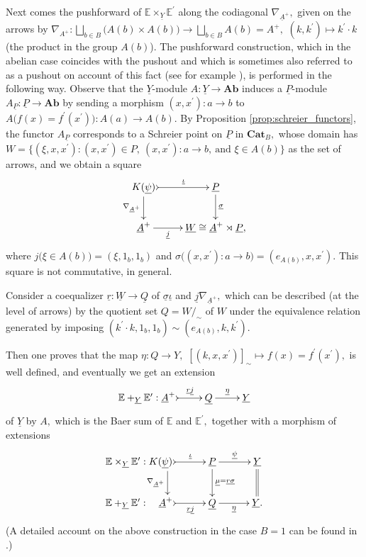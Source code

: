 \documentclass[11pt]{amsart}
\theoremstyle{plain}
\theoremstyle{definition}
\theoremstyle{remark}
\newcommand{\un}{\underline}
\begin{document}
Next comes the pushforward of $\mathbb{E}\times_{\un{Y}}\mathbb{E}^\prime$ along the codiagonal $\nabla_{\un{A}^+},$ given on the arrows by $\nabla_{A^+}\colon\bigsqcup_{b\in B}\big(A(b)\times A(b)\big)\longrightarrow\bigsqcup_{b\in B}A(b)=A^+,$ $(k,k^\prime)\mapsto k^\prime\cdot k$ (the product in the group $A(b)$). The pushforward construction, which in the abelian case coincides with the pushout and which is sometimes also referred to as a pushout on account of this fact (see for example \cite{holt, golasinski}), is performed in the following way. Observe that the $\un{Y}$-module $A\colon\un{Y}\rightarrow\mathbf{Ab}$ induces a $\un{P}$-module $A_{\un{P}}\colon\un{P}\rightarrow\mathbf{Ab}$ by sending a morphism $(x,x^\prime)\colon a\rightarrow b$ to $A\big(f(x)=f^\prime(x^\prime)\big)\colon A(a)\rightarrow A(b).$ By Proposition \ref{prop:schreier_functors}, the functor $A_{\un{P}}$ corresponds to a Schreier point on $\un{P}$ in $\mathbf{Cat}_B,$ whose domain has $W=\{(\xi,x,x^\prime):(x,x^\prime)\in P, \ (x,x^\prime)\colon a\rightarrow b, \ \text{and } \xi\in A(b)\}$ as the set of arrows, and we obtain a square
\begin{equation*}
\xymatrix{
{K(\un{\psi})} \ar[d]_-{\nabla_{\un{A}^+}} \ar@{>->}[r]^-{\un{\iota}} &{\un{P}} \ar[d]^-{\un{\sigma}} \\
{\un{A}^+} \ar[r]_-{\un{j}} &{\un{W}\cong \un{A}^+\rtimes \un{P},}
}
\end{equation*}
where $j\big(\xi\in A(b)\big)=(\xi,1_b,1_b)$ and $\sigma\big((x,x^\prime):a\rightarrow b\big)=(e_{A(b)},x,x^\prime).$ This square is not commutative, in general.

Consider a coequalizer $\un{r}\colon\un{W}\longrightarrow\un{Q}$ of $\un{\sigma}\un{\iota}$ and $\un{j}\nabla_{\un{A}^+},$ which can be described (at the level of arrows) by the quotient set $Q=W/_{\sim}$ of $W$ under the equivalence relation generated by imposing $(k^\prime\cdot k,1_b,1_b)\sim(e_{A(b)},k,k^\prime).$

Then one proves that the map $\eta\colon Q\longrightarrow Y,$ $[(k,x,x^\prime)]_{\sim}\mapsto f(x)=f^\prime(x^\prime),$ is well defined, and eventually we get an extension
\begin{equation}
\label{eqn:baer_sum}
\xymatrix{{\mathbb{E}+_{\un{Y}}\mathbb{E}^\prime:\un{A}^+} \ar@{>->}[r]^-{\un{r}\un{j}} &{\un{Q}} \ar[r]^-{\un{\eta}} &{\un{Y}}}
\end{equation}
of $\un{Y}$ by $A,$ which is the Baer sum of $\mathbb{E}$ and $\mathbb{E}^\prime,$ together with a morphism of extensions
\begin{equation}
\begin{aligned}
\label{eqn:cocart_on_product}
\xymatrixcolsep{2.5pc}
\xymatrix{
{\mathbb{E}\times_{\un{Y}}\mathbb{E}^\prime:K(\un{\psi})} \ar@<2.4pc>[d]_-{\nabla_{\un{A}^+}} \ar@{>->}[r]^-{\un{\iota}} &{\un{P}} \ar[d]^-{\un{\mu}=\un{r}\un{\sigma}} \ar[r]^-{\un{\psi}} &{\un{Y}} \ar@{=}[d] \\
{\mathbb{E}+_{\un{Y}}\mathbb{E}^\prime: \ \ \ \un{A}^+} \ar@{>->}[r]_-{\un{r}\un{j}} &{\un{Q}} \ar[r]_-{\un{\eta}} &{\un{Y}.}
}
\end{aligned}
\end{equation}
(A detailed account on the above construction in the case $B=1$ can be found in \cite{MMS18}.)
\end{document}
